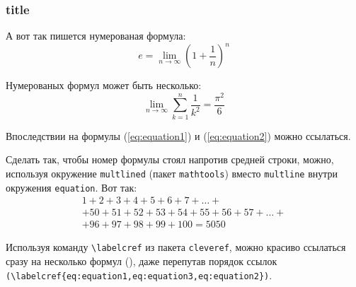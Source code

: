 \subsubsection{title}

А вот так пишется нумерованая формула:
\begin{equation}
  \label{eq:equation1}
  e = \lim_{n \to \infty} \left( 1+\frac{1}{n} \right) ^n
\end{equation}

Нумерованых формул может быть несколько:
\begin{equation}
  \label{eq:equation2}
  \lim_{n \to \infty} \sum_{k=1}^n \frac{1}{k^2} = \frac{\pi^2}{6}
\end{equation}

Впоследствии на формулы (\ref{eq:equation1}) и (\ref{eq:equation2}) можно ссылаться.

Сделать так, чтобы номер формулы стоял напротив средней строки, можно,
используя окружение \verb|multlined| (пакет \verb|mathtools|) вместо
\verb|multline| внутри окружения \verb|equation|. Вот так:
\begin{equation} %
  \label{eq:equation3}
    \begin{multlined}
        1+ 2+3+4+5+6+7+\dots + \\
        + 50+51+52+53+54+55+56+57 + \dots + \\
        + 96+97+98+99+100=5050
    \end{multlined}
\end{equation}

Используя команду \verb|\labelcref| из пакета \verb|cleveref|, можно
красиво ссылаться сразу на несколько формул
(), даже перепутав
порядок ссылок \verb|(\labelcref{eq:equation1,eq:equation3,eq:equation2})|.
